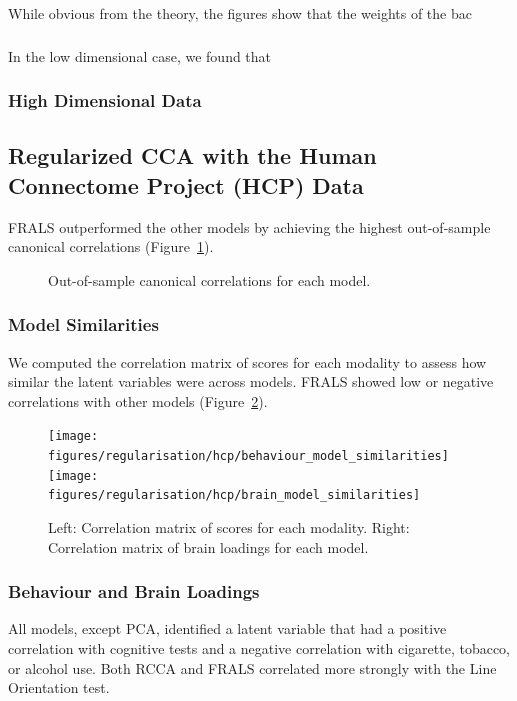 While obvious from the theory, the figures show that the weights of the bac

\subsubsection{}

In the low dimensional case, we found that

\subsubsection{High Dimensional Data}


\subsection{Regularized CCA with the Human Connectome Project (HCP) Data}

FRALS outperformed the other models by achieving the highest out-of-sample canonical correlations (Figure~\ref{fig:performance}).

\begin{figure}[h]
\centering

\caption{Out-of-sample canonical correlations for each model.}
\label{fig:performance}
\end{figure}

\subsubsection{Model Similarities}
We computed the correlation matrix of scores for each modality to assess how similar the latent variables were across models. FRALS showed low or negative correlations with other models (Figure~\ref{fig:similarities}).

\begin{figure}[h]
\centering
\texttt{[image: figures/regularisation/hcp/behaviour\_model\_similarities]}
\texttt{[image: figures/regularisation/hcp/brain\_model\_similarities]}
\caption{Left: Correlation matrix of scores for each modality. Right: Correlation matrix of brain loadings for each model.}
\label{fig:similarities}
\end{figure}

\subsubsection{Behaviour and Brain Loadings}
All models, except PCA, identified a latent variable that had a positive correlation with cognitive tests and a negative correlation with cigarette, tobacco, or alcohol use. Both RCCA and FRALS correlated more strongly with the Line Orientation test.

